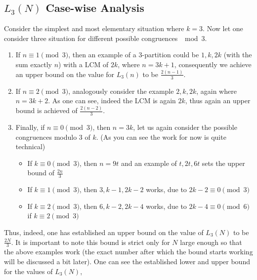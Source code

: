 \documentclass{article}
\begin{document}
\subsection{\(L_3(N)\) Case-wise Analysis}

Consider the simplest and most elementary situation where \(k = 3\). Now let one consider three situation for different possible congruences \(\mod 3\).

\begin{enumerate}
	\item If \(n \equiv 1 \pmod{3}\), then an example of a 3-partition could be \(1, k, 2k\) (with the sum exactly \(n\)) with a LCM of \(2k\), where \(n = 3k +1\), consequently we achieve an upper bound on the value for \(L_3(n)\) to be \(\frac{2(n - 1)}{3}\).
	\item If \(n \equiv 2 \pmod{3}\), analogously consider the example \(2, k, 2k\), again where \(n = 3k + 2\). As one can see, indeed the LCM is again \(2k\), thus again an upper bound is achieved of \(\frac{2(n - 2)}{3}\).
	\item Finally, if \(n \equiv 0 \pmod{3}\), then \(n = 3k\), let us again consider the possible congruences modulo \(3\) of \(k\). (As you can see the work for now is quite technical)
	\begin{itemize}
		\item If \(k \equiv 0 \pmod{3}\), then \(n = 9t\) and an example of \(t, 2t, 6t\) sets the upper bound of \(\frac{2n}{3}\)
		\item If \(k \equiv 1 \pmod{3}\), then \(3, k - 1, 2k - 2\) works, due to \(2k - 2 \equiv 0 \pmod{3}\)
		\item If \(k \equiv 2 \pmod{3}\), then \(6, k - 2, 2k - 4\) works, due to \(2k - 4 \equiv 0 \pmod{6}\) if \(k \equiv 2 \pmod{3}\)
	\end{itemize}
\end{enumerate}
Thus, indeed, one has established an upper bound on the value of \(L_3(N)\) to be \(\frac{2N}{3}\). It is important to note this bound is strict only for \(N\) large enough so that the above examples work (the exact number after which the bound starts working will be discussed a bit later). One can see the established lower and upper bound for the values of \(L_3(N)\),
\end{document}
